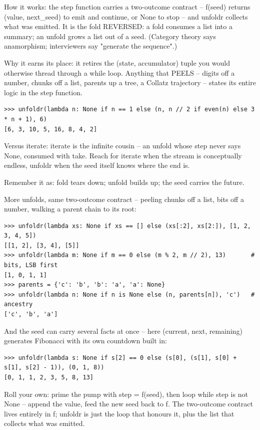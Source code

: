 \documentclass[10pt,letterpaper]{book}
\begin{document}
How it works: the step function carries a two-outcome contract -- f(seed) returns (value, next\_seed) to emit and continue, or None to stop -- and unfoldr collects what was emitted. It is the fold REVERSED: a fold consumes a list into a summary; an unfold grows a list out of a seed. (Category theory says anamorphism; interviewers say "generate the sequence".)


Why it earns its place: it retires the (state, accumulator) tuple you would otherwise thread through a while loop. Anything that PEELS -- digits off a number, chunks off a list, parents up a tree, a Collatz trajectory -- states its entire logic in the step function.

\begin{lstlisting}[style=ex]
>>> unfoldr(lambda n: None if n == 1 else (n, n // 2 if even(n) else 3 * n + 1), 6)
[6, 3, 10, 5, 16, 8, 4, 2]
\end{lstlisting}

Versus iterate: iterate is the infinite cousin -- an unfold whose step never says None, consumed with take. Reach for iterate when the stream is conceptually endless, unfoldr when the seed itself knows where the end is.


Remember it as: fold tears down; unfold builds up; the seed carries the future.


More unfolds, same two-outcome contract -- peeling chunks off a list, bits off a number, walking a parent chain to its root:

\begin{lstlisting}[style=ex]
>>> unfoldr(lambda xs: None if xs == [] else (xs[:2], xs[2:]), [1, 2, 3, 4, 5])
[[1, 2], [3, 4], [5]]
>>> unfoldr(lambda m: None if m == 0 else (m % 2, m // 2), 13)       # bits, LSB first
[1, 0, 1, 1]
>>> parents = {'c': 'b', 'b': 'a', 'a': None}
>>> unfoldr(lambda n: None if n is None else (n, parents[n]), 'c')   # ancestry
['c', 'b', 'a']
\end{lstlisting}

And the seed can carry several facts at once -- here (current, next, remaining) generates Fibonacci with its own countdown built in:

\begin{lstlisting}[style=ex]
>>> unfoldr(lambda s: None if s[2] == 0 else (s[0], (s[1], s[0] + s[1], s[2] - 1)), (0, 1, 8))
[0, 1, 1, 2, 3, 5, 8, 13]
\end{lstlisting}

Roll your own: prime the pump with step = f(seed), then loop while step is not None -- append the value, feed the new seed back to f. The two-outcome contract lives entirely in f; unfoldr is just the loop that honours it, plus the list that collects what was emitted.
\end{document}
